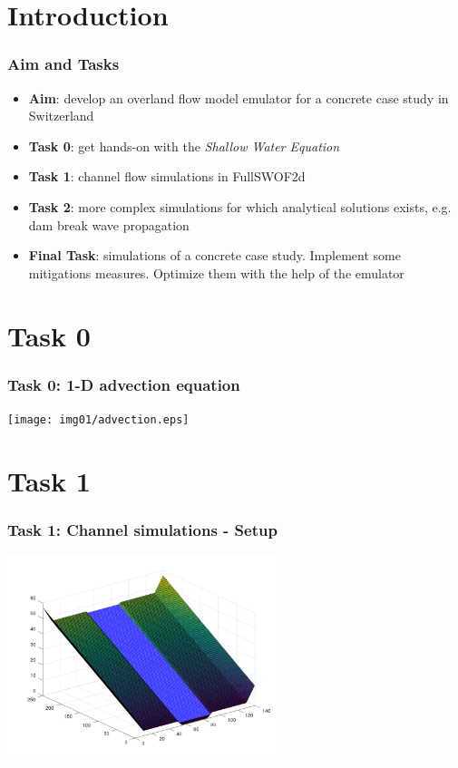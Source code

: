 \documentclass[xcolor=dvipsnames, USenglish]{beamer}  %
\begin{document}
\section{Introduction}

  \begin{frame}
    \frametitle{Aim and Tasks}
    \begin{itemize}
      \item \textbf{Aim}: develop an overland flow model emulator for a concrete case study in Switzerland
      \item \textbf{Task 0}: get hands-on with the \emph{Shallow Water Equation}
      \item \textbf{Task 1}: channel flow simulations in FullSWOF2d
      \item \textbf{Task 2}: more complex simulations for which analytical
        solutions exists, e.g. dam break wave propagation
      \item \textbf{Final Task}: simulations of a concrete case study. Implement
        some mitigations measures. Optimize them with the help of the emulator
     \end{itemize}
  \end{frame}


\section{Task 0}

  \begin{frame}
    \frametitle{Task 0: 1-D advection equation}
    \centering
    \texttt{[image: img01/advection.eps]}
  \end{frame}


\section{Task 1}

  \begin{frame}
    \frametitle{Task 1: Channel simulations - Setup}
    \centering
    \includegraphics[width=0.6\textwidth]{img/simulation-setup.png}
  \end{frame}
\end{document}
